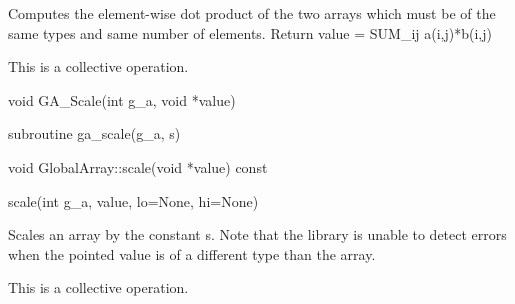\documentclass[12pt]{article}
\begin{document}
\begin{desc}

Computes the element-wise dot product of the two arrays which must be of the same types and same number of elements.
      Return value = SUM_ij a(i,j)*b(i,j)


This is a collective operation.

\end{desc}


\begin{capi}
\begin{ccode}
void GA_Scale(int g_a, void *value)
\end{ccode}
\begin{funcargs}
\end{funcargs}
\end{capi}

\begin{fapi}
\begin{fcode}
subroutine ga_scale(g_a, s) 
\end{fcode}
\begin{funcargs}
\end{funcargs}
\end{fapi}

\begin{cxxapi}
\begin{cxxcode}
void GlobalArray::scale(void *value) const
\end{cxxcode}
\begin{funcargs}
\end{funcargs}
\end{cxxapi}

\begin{pyapi}
\begin{pycode}
scale(int g_a, value, lo=None, hi=None)
\end{pycode}
\end{pyapi}
\gcoll

\begin{desc}

Scales an array by the constant s. Note that the library is unable to detect
errors when the pointed value is of a different type than the array.

This is a collective operation.

\end{desc}
\end{document}
